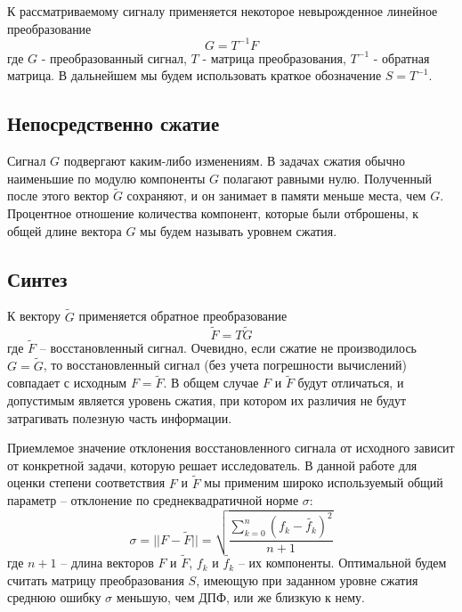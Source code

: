 \documentclass[11pt, oneside, a4paper]{article}
\begin{document}
К рассматриваемому сигналу применяется некоторое невырожденное линейное преобразование
\begin{equation}
\label{directConverstion}
    G = T^{-1} F
\end{equation}
где $G$ - преобразованный сигнал, $T$ - матрица преобразования, $T^{-1}$ - обратная матрица. В дальнейшем мы будем использовать краткое обозначение $S = T^{-1}$.

\subsection{Непосредственно сжатие} 

Сигнал $G$ подвергают каким-либо изменениям. В задачах сжатия обычно наименьшие по модулю компоненты $G$ полагают равными нулю. Полученный после этого вектор $\tilde{G}$ сохраняют, и он занимает в памяти меньше места, чем $G$. Процентное отношение количества компонент, которые были отброшены, к общей длине вектора $G$ мы будем называть уровнем сжатия.

\subsection{Синтез} 

К вектору $\tilde{G}$ применяется обратное преобразование 
\begin{equation}
\label{inverseConverstion}
    \tilde{F} = T\tilde{G}
\end{equation}
где $\tilde{F}$ – восстановленный сигнал. Очевидно, если сжатие не производилось $G=\tilde{G}$, то восстановленный сигнал (без учета погрешности вычислений) совпадает с исходным $F=\tilde{F}$. В общем случае $F$ и $\tilde{F}$ будут отличаться, и допустимым является уровень сжатия, при котором их различия не будут затрагивать полезную часть информации.

Приемлемое значение отклонения восстановленного сигнала от исходного зависит от конкретной задачи, которую решает исследователь. В данной работе для оценки степени соответствия $F$ и $\tilde{F}$ мы применим широко используемый общий параметр – отклонение по среднеквадратичной норме $\sigma$:
\begin{equation}
\label{squareNorm}
    \sigma = ||F-\tilde{F}||=\sqrt{\frac{\sum\limits_{k=0}^{n}(f_k-\tilde{f_k})^2}{n+1}}
\end{equation}
где $n+1$ – длина векторов $F$ и $\tilde{F}$, $f_k$ и $\tilde{f_k}$ – их компоненты. Оптимальной будем считать матрицу преобразования $S$, имеющую при заданном уровне сжатия среднюю ошибку $\sigma$ меньшую, чем ДПФ, или же близкую к нему.
\end{document}
